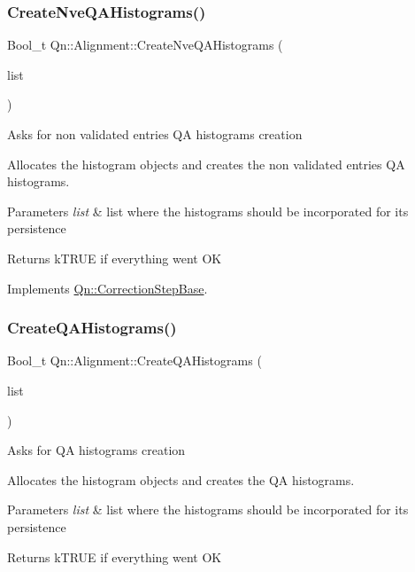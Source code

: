 \subsubsection{\texorpdfstring{Create\+Nve\+Q\+A\+Histograms()}{CreateNveQAHistograms()}}
{\footnotesize\ttfamily Bool\+\_\+t Qn\+::\+Alignment\+::\+Create\+Nve\+Q\+A\+Histograms (\begin{DoxyParamCaption}\item[{T\+List $\ast$}]{list }\end{DoxyParamCaption})\hspace{0.3cm}{\ttfamily [virtual]}}

Asks for non validated entries QA histograms creation

Allocates the histogram objects and creates the non validated entries QA histograms. 
\begin{DoxyParams}{Parameters}
{\em list} & list where the histograms should be incorporated for its persistence \\
\hline
\end{DoxyParams}
\begin{DoxyReturn}{Returns}
k\+T\+R\+UE if everything went OK 
\end{DoxyReturn}


Implements \mbox{\hyperlink{classQn_1_1CorrectionStepBase_acb488e715005f027e39c21ae5f4684da}{Qn\+::\+Correction\+Step\+Base}}.

\mbox{\label{classQn_1_1Alignment_a1b2499a48a748c4064804e0a5a283272}} 
\subsubsection{\texorpdfstring{Create\+Q\+A\+Histograms()}{CreateQAHistograms()}}
{\footnotesize\ttfamily Bool\+\_\+t Qn\+::\+Alignment\+::\+Create\+Q\+A\+Histograms (\begin{DoxyParamCaption}\item[{T\+List $\ast$}]{list }\end{DoxyParamCaption})\hspace{0.3cm}{\ttfamily [virtual]}}

Asks for QA histograms creation

Allocates the histogram objects and creates the QA histograms. 
\begin{DoxyParams}{Parameters}
{\em list} & list where the histograms should be incorporated for its persistence \\
\hline
\end{DoxyParams}
\begin{DoxyReturn}{Returns}
k\+T\+R\+UE if everything went OK 
\end{DoxyReturn}


